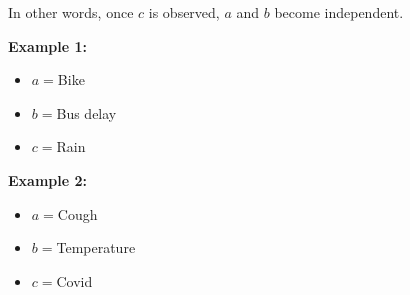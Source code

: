 In other words, once $c$ is observed, $a$ and $b$ become independent. \newline

\textbf{Example 1:}
\begin{itemize}
    \item $a=$Bike
    \item $b=$Bus delay
    \item $c=$Rain
\end{itemize}

\textbf{Example 2:}
\begin{itemize}
    \item $a=$Cough
    \item $b=$Temperature
    \item $c=$Covid
\end{itemize}

